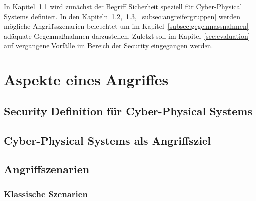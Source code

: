 \documentclass[final,bibliography=totocnumbered]{include/sikseminar}
\begin{document}
In Kapitel~\ref{subsec:definition} wird zunächst der Begriff Sicherheit speziell für Cyber-Physical Systems definiert.
In den Kapiteln~\ref{subsec:angriffsziel},~\ref{subsec:angriffszenarien},~\ref{subsec:angreifergruppen} werden mögliche Angriffsszenarien beleuchtet um im Kapitel~\ref{subsec:gegenmassnahmen} adäquate Gegenmaßnahmen darzustellen.
Zuletzt soll im Kapitel~\ref{sec:evaluation} auf vergangene Vorfälle im Bereich der Security eingegangen werden.







\section{Aspekte eines Angriffes}\label{sec:aspekte}


\subsection{Security Definition f\"ur Cyber-Physical Systems}\label{subsec:definition}


\subsection{Cyber-Physical Systems als Angriffsziel}\label{subsec:angriffsziel}

\subsection{Angriffszenarien}\label{subsec:angriffszenarien}
\subsubsection{Klassische Szenarien}
\end{document}
